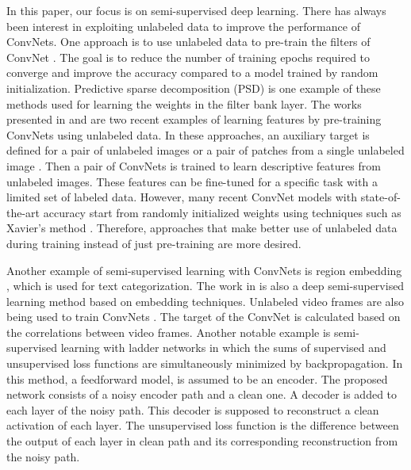 \documentclass{article}
\begin{document}
In this paper, our focus is on semi-supervised deep learning. There has always been interest in exploiting unlabeled data to improve the performance of ConvNets. One approach is to use unlabeled data to pre-train the filters of ConvNet \cite{lecun2010convolutional, jarrett2009best}. The goal is to reduce the number of training epochs required to converge and improve the accuracy compared to a model trained by random initialization. Predictive sparse decomposition (PSD) \cite{kavukcuoglu2010fast} is one example of these methods used for learning the weights in the filter bank layer. The works presented in \cite{agrawal2015learning} and \cite{doersch2015unsupervised} are two recent examples of learning features by pre-training ConvNets using unlabeled data. In these approaches, an auxiliary target is defined for a pair of unlabeled images \cite{agrawal2015learning} or a pair of patches from a single unlabeled image \cite{doersch2015unsupervised}. Then a pair of ConvNets is trained to learn descriptive features from unlabeled images. These features can be fine-tuned for a specific task with a limited set of labeled data. However, many recent ConvNet models with state-of-the-art accuracy start from randomly initialized weights using techniques such as Xavier's method \cite{glorot2010understanding, szegedy2015going}. Therefore, approaches that make better use of unlabeled data during training instead of just pre-training are more desired. 

Another example of semi-supervised learning with ConvNets is region embedding \cite{johnson2015semi}, which is used for text categorization. The work in \cite{weston2012deep} is also a deep semi-supervised learning method based on embedding techniques. Unlabeled video frames are also being used to train ConvNets \cite{wang2015unsupervised, jayaraman2015learning}. The target of the ConvNet is calculated based on the correlations between video frames. Another notable example is semi-supervised learning with ladder networks \cite{rasmus2015semi} in which the sums of supervised and unsupervised loss functions are simultaneously minimized by backpropagation. In this method, a feedforward model, is assumed to be an encoder. The proposed network consists of a noisy encoder path and a clean one. A decoder is added to each layer of the noisy path. This decoder is supposed to reconstruct a clean activation of each layer. The unsupervised loss function is the difference between the output of each layer in clean path and its corresponding reconstruction from the noisy path. 
\end{document}

